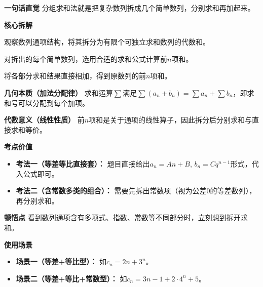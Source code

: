 \begin{explanationbox}
	\textbf{\textcolor{CExplanation}{一句话直觉}}
	分组求和法就是把复杂数列拆成几个简单数列，分别求和再加起来。

	\medskip
	\textbf{\textcolor{CExplanation}{核心拆解}}
	\begin{description}[style=nextline, leftmargin=2.8em, labelsep=0.5em, itemsep=0.45em]
		\item[\textbf{要点一（通项拆分）：}]
			观察数列通项结构，将其拆分为有限个可独立求和数列的代数和。
		\item[\textbf{要点二（分别求和）：}]
			对拆出的每个简单数列，选用合适的求和公式计算前$n$项和。
		\item[\textbf{要点三（结果合并）：}]
			将各部分求和结果直接相加，得到原数列的前$n$项和。
	\end{description}

	\medskip
	\textbf{\textcolor{CExplanation}{几何本质（加法分配律）}}
	求和运算$\sum$满足$\sum (a_n+b_n)=\sum a_n+\sum b_n$，即求和号可以分配到每个加项。

	\medskip
	\textbf{\textcolor{CExplanation}{代数意义（线性性质）}}
	前$n$项和是关于通项的线性算子，因此拆分后分别求和与直接求和等价。

	\medskip
	\textbf{\textcolor{CExplanation}{考点价值}}
	\begin{itemize}[leftmargin=*, itemsep=0.5em, topsep=0.4em]
		\item \textbf{考法一（等差等比直接套）：} 题目直接给出$a_n=An+B$, $b_n=Cq^{n-1}$形式，代入公式即可。
		\item \textbf{考法二（含常数多类的组合）：} 需要先拆出常数项（视为公差$0$的等差数列），再分别求和。
	\end{itemize}

	\medskip
	\textbf{\textcolor{CExplanation}{顿悟点}}
	看到数列通项含有多项式、指数、常数等不同部分时，立刻想到拆开求和。

	\medskip
	\textbf{\textcolor{CExplanation}{使用场景}}
	\begin{itemize}[leftmargin=*, itemsep=0.5em, topsep=0.4em]
		\item \textbf{场景一（等差+等比型）：} 如$c_n=2n+3^n$。
		\item \textbf{场景二（等差+等比+常数型）：} 如$c_n=3n-1+2\cdot4^n+5$。
	\end{itemize}

\end{explanationbox}
